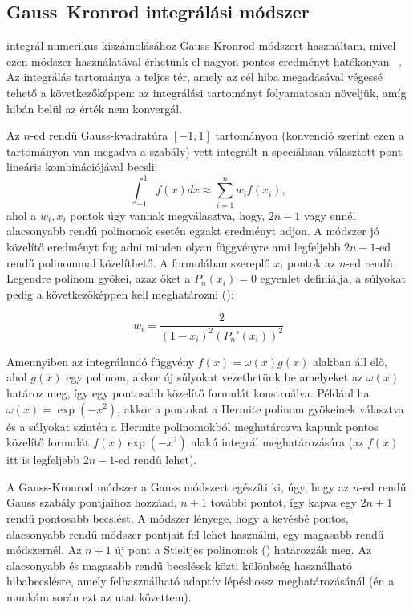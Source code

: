 \documentclass[10pt,a4paper]{article}
\numberwithin{equation}{subsection}
\numberwithin{figure}{section}
\begin{document}
\subsection{Gauss–Kronrod integrálási módszer}\label{sec:GK}

 integrál numerikus kiszámolásához Gauss-Kronrod módszert használtam, mivel ezen módszer használatával érhetünk el nagyon pontos eredményt hatékonyan  ~\cite{LevyEff}. Az integrálás tartománya a teljes tér, amely az cél hiba megadásával végessé tehető a következőképpen: az integrálási tartományt folyamatosan növeljük, amíg hibán belül az érték nem konvergál. 

Az $n$-ed rendű Gauss-kvadratúra $[-1,1]$ tartományon (konvenció szerint ezen a tartományon van megadva a szabály) vett integrált n speciálisan választott pont lineáris kombinációjával becsli:
\begin{equation}
\int_{-1}^1 f(x)dx\approx \sum_{i=1}^n w_if(x_i),
\end{equation}
ahol a $w_i, x_i$ pontok úgy vannak megválasztva, hogy, $2n-1$ vagy ennél alacsonyabb rendű polinomok esetén egzakt eredményt adjon. A módszer jó közelítő eredményt fog adni minden olyan függvényre ami legfeljebb $2n-1$-ed rendű polinommal közelíthető. A formulában szereplő $x_i$ pontok az $n$-ed rendű Legendre polinom gyökei, azaz őket a $P_n(x_i)=0$ egyenlet definiálja, a súlyokat pedig a következőképpen kell meghatározni (\cite{LGQ}):

\begin{equation}
w_i=\frac{2}{(1-x_i)^2(P_n'(x_i))^2}
\end{equation}

Amennyiben az integrálandó függvény $f(x)=\omega(x)g(x)$ alakban áll elő, ahol $g(x)$ egy polinom, akkor új súlyokat vezethetünk be amelyeket az $\omega(x)$ határoz meg, így egy pontosabb közelítő formulát konstruálva. Például ha $\omega(x)=\exp(-x^2)$, akkor a pontokat a Hermite polinom gyökeinek választva és a súlyokat szintén a Hermite polinomokból meghatározva kapunk pontos közelítő formulát $f(x)\exp(-x^2)$ alakú integrál meghatározására (az $f(x)$ itt is legfeljebb $2n-1$-ed rendű lehet).

A Gauss-Kronrod módszer a Gauss módszert egészíti ki, úgy, hogy az $n$-ed rendű Gauss szabály pontjaihoz hozzáad, $n+1$ további pontot, így kapva egy $2n+1$ rendű pontosabb becslést. A módszer lényege, hogy a kevésbé pontos, alacsonyabb rendű módszer pontjait fel lehet használni, egy magasabb rendű módszernél. Az $n+1$ új pont a Stieltjes polinomok (\cite{NIST:DLMF}) határozzák meg. Az alacsonyabb és magasabb rendű becslések közti különbség használható hibabecslésre, amely felhasználható adaptív lépéshossz meghatározásánál (én a munkám során ezt az utat követtem). 
\end{document}
